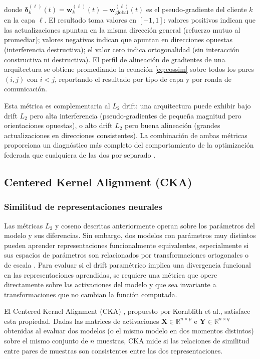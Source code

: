 donde $\boldsymbol{\delta}_k^{(\ell)}(t) = \mathbf{w}_k^{(\ell)}(t) -
\mathbf{w}_{\text{global}}^{(\ell)}(t)$ es el pseudo-gradiente del cliente $k$ en la capa
$\ell$. El resultado toma valores en $[-1, 1]$: valores positivos indican que las
actualizaciones apuntan en la misma dirección general (refuerzo mutuo al promediar); valores
negativos indican que apuntan en direcciones opuestas (interferencia destructiva); el valor
cero indica ortogonalidad (sin interacción constructiva ni destructiva). El perfil de
alineación de gradientes de una arquitectura se obtiene promediando la ecuación \eqref{eq:cossim}
sobre todos los pares $(i, j)$ con $i < j$, reportando el resultado por tipo de capa y por
ronda de comunicación.

Esta métrica es complementaria al $L_2$ drift: una arquitectura puede exhibir bajo drift $L_2$
pero alta interferencia (pseudo-gradientes de pequeña magnitud pero orientaciones opuestas), o
alto drift $L_2$ pero buena alineación (grandes actualizaciones en direcciones consistentes).
La combinación de ambas métricas proporciona un diagnóstico más completo del comportamiento de
la optimización federada que cualquiera de las dos por separado \cite{son2022comparisons}.

\subsection{Centered Kernel Alignment (CKA)}

\subsubsection{Similitud de representaciones neurales}

Las métricas $L_2$ y coseno descritas anteriormente operan sobre los parámetros del modelo y
sus diferencias. Sin embargo, dos modelos con parámetros muy distintos pueden aprender
representaciones funcionalmente equivalentes, especialmente si sus espacios de parámetros son relacionados por transformaciones
ortogonales o de escala \cite{DBLP:journals/corr/abs-1905-00414}. Para evaluar si el drift
paramétrico implica una divergencia funcional en las representaciones aprendidas, se requiere
una métrica que opere directamente sobre las activaciones del modelo y que sea invariante a
transformaciones que no cambian la función computada.

El Centered Kernel Alignment (CKA) \cite{DBLP:journals/corr/abs-1905-00414}, propuesto por
Kornblith et al., satisface esta propiedad. Dadas las matrices de activaciones
$\mathbf{X} \in \mathbb{R}^{n \times p}$ e $\mathbf{Y} \in \mathbb{R}^{n \times q}$
obtenidas al evaluar dos modelos (o el mismo modelo en dos momentos distintos) sobre el mismo
conjunto de $n$ muestras, CKA mide si las relaciones de similitud entre pares de muestras son
consistentes entre las dos representaciones.

